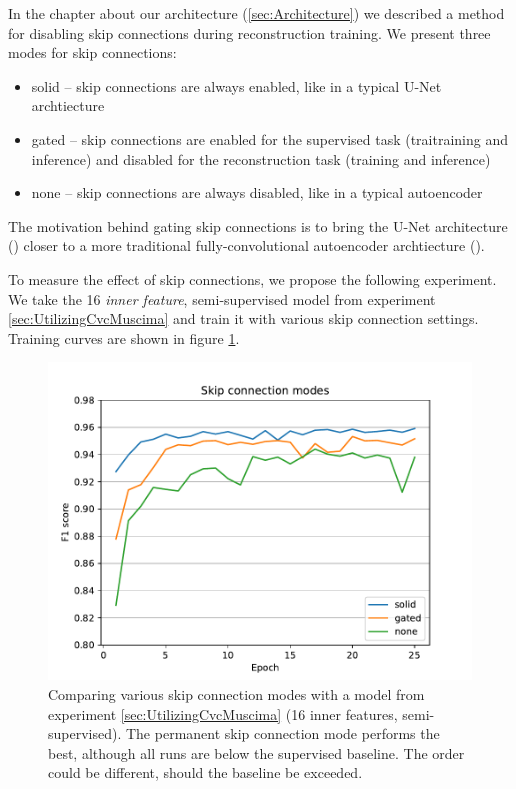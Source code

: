 In the chapter about our architecture (\ref{sec:Architecture}) we described a method for disabling skip connections during reconstruction training. We present three modes for skip connections:

\begin{itemize}
    \item solid -- skip connections are always enabled, like in a typical U-Net archtiecture
    \item gated -- skip connections are enabled for the supervised task (traitraining and inference) and disabled for the reconstruction task (training and inference)
    \item none -- skip connections are always disabled, like in a typical autoencoder
\end{itemize}

The motivation behind gating skip connections is to bring the U-Net architecture (\cite{UNet}) closer to a more traditional fully-convolutional autoencoder archtiecture (\cite{AutoencodersOverview}).

To measure the effect of skip connections, we propose the following experiment. We take the 16 \emph{inner feature}, semi-supervised model from experiment \ref{sec:UtilizingCvcMuscima} and train it with various skip connection settings. Training curves are shown in figure \ref{fig:SkipConnections}.

\begin{figure}[ht]
    \centering
    \includegraphics[width=140mm]{../../figures/05-skip-connections/skip.pdf}
    \caption{Comparing various skip connection modes with a model from experiment \ref{sec:UtilizingCvcMuscima} (16 inner features, semi-supervised). The permanent skip connection mode performs the best, although all runs are below the supervised baseline. The order could be different, should the baseline be exceeded.}
    \label{fig:SkipConnections}
\end{figure}


